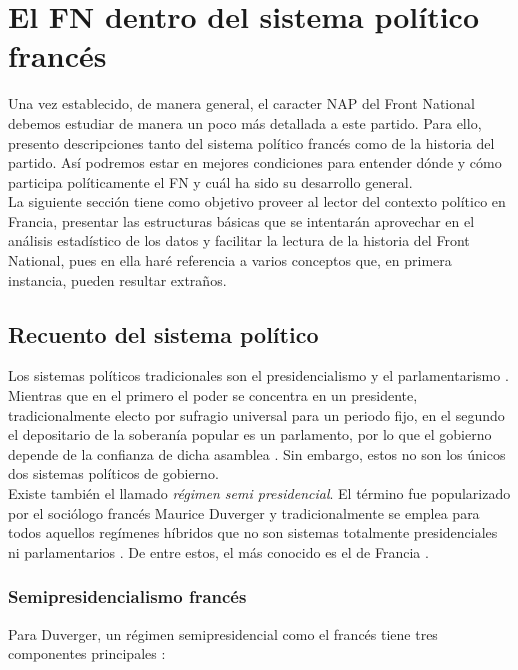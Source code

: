 \chapter{El FN dentro del sistema político francés}

Una vez establecido, de manera general, el caracter NAP del Front National debemos estudiar de manera un poco más detallada a este partido. Para ello, presento descripciones tanto del sistema político francés como de la historia del partido. Así podremos estar en mejores condiciones para entender dónde y cómo participa políticamente el FN y cuál ha sido su desarrollo general.\\

La siguiente sección tiene como objetivo proveer al lector del contexto político en Francia, presentar las estructuras básicas que se intentarán aprovechar en el análisis estadístico de los datos y facilitar la lectura de la historia del Front National, pues en ella haré referencia a varios conceptos que, en primera instancia, pueden resultar extraños.

\section{Recuento del sistema político}

Los sistemas políticos tradicionales son el presidencialismo y el parlamentarismo \parencites{Carpizo04}{Veser99}. Mientras que en el primero el poder se concentra en un presidente, tradicionalmente electo por sufragio universal para un periodo fijo, en el segundo el depositario de la soberanía popular es un parlamento, por lo que el gobierno depende de la confianza de dicha asamblea \parencite{Linz90}. Sin embargo, estos no son los únicos dos sistemas políticos de gobierno.\\ 

Existe también el llamado \textit{régimen semi presidencial}. El término fue popularizado por el sociólogo francés Maurice Duverger y tradicionalmente se emplea para todos aquellos regímenes híbridos que no son sistemas totalmente  presidenciales ni parlamentarios \parencites{Veser99}{Carpizo04}{Linz90}. De entre estos, el más conocido es el de Francia \parencite{Carpizo04}.

\subsection{Semipresidencialismo francés}

Para Duverger, un régimen semipresidencial como el francés tiene tres componentes principales \parencite{Veser99}:

